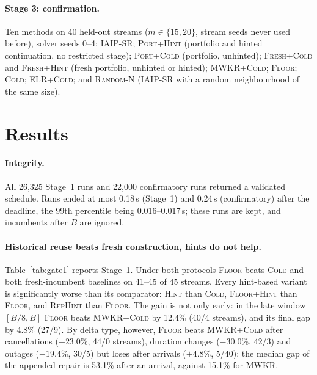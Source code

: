 \documentclass[letterpaper]{article} %
\newcommand{\mcold}{\textsc{Cold}}
\newcommand{\mhint}{\textsc{Hint}}
\newcommand{\mfloor}{\textsc{Floor}}
\newcommand{\mfh}{\textsc{Floor+Hint}}
\newcommand{\mrho}{\textsc{RepHint}}
\newcommand{\mmwkr}{\textsc{MWKR+Cold}}
\newcommand{\miaip}{\textsc{IAIP-SR}}
\newcommand{\mfresh}{\textsc{Fresh+Cold}}
\newcommand{\mfreshh}{\textsc{Fresh+Hint}}
\newcommand{\mpc}{\textsc{Port+Cold}}
\newcommand{\mph}{\textsc{Port+Hint}}
\newcommand{\mrnd}{\textsc{Random-N}}
\newcommand{\melrc}{\textsc{ELR+Cold}}
\begin{document}
\paragraph{Stage 3: confirmation.} Ten methods on 40 held-out streams ($m\in\{15,20\}$, stream seeds never used before), solver seeds 0--4: \miaip; \mph{} (portfolio and hinted continuation, no restricted stage); \mpc{} (portfolio, unhinted); \mfresh{} and \mfreshh{} (fresh portfolio, unhinted or hinted); \mmwkr; \mfloor; \mcold; \melrc; and \mrnd{} (\miaip{} with a random neighbourhood of the same size).

\section{Results}

\paragraph{Integrity.} All 26{,}325 Stage~1 runs and 22{,}000 confirmatory runs returned a validated schedule. Runs ended at most 0.18\,s (Stage~1) and 0.24\,s (confirmatory) after the deadline, the 99th percentile being 0.016--0.017\,s; these runs are kept, and incumbents after $B$ are ignored.

\paragraph{Historical reuse beats fresh construction, hints do not help.} Table~\ref{tab:gate1} reports Stage~1. Under both protocols \mfloor{} beats \mcold{} and both fresh-incumbent baselines on 41--45 of 45 streams. Every hint-based variant is significantly worse than its comparator: \mhint{} than \mcold, \mfh{} than \mfloor, and \mrho{} than \mfloor. The gain is not only early: in the late window $[B/8,B]$ \mfloor{} beats \mmwkr{} by 12.4\% (40/4 streams), and its final gap by 4.8\% (27/9). By delta type, however, \mfloor{} beats \mmwkr{} after cancellations ($-23.0$\%, 44/0 streams), duration changes ($-30.0$\%, 42/3) and outages ($-19.4$\%, 30/5) but loses after arrivals ($+4.8$\%, 5/40): the median gap of the appended repair is 53.1\% after an arrival, against 15.1\% for MWKR.
\end{document}
